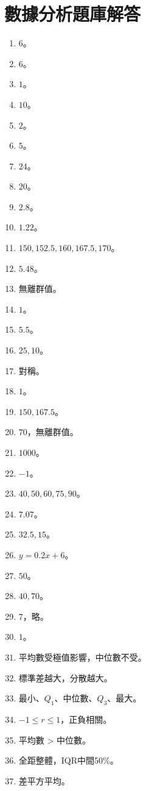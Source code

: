 \section{數據分析題庫解答}
\begin{enumerate}[label=\arabic*.]
    \item $6$。
    \item $6$。
    \item $1$。
    \item $10$。
    \item $2$。
    \item $5$。
    \item $24$。
    \item $20$。
    \item $2.8$。
    \item $1.22$。
    \item $150, 152.5, 160, 167.5, 170$。
    \item $5.48$。
    \item 無離群值。
    \item $1$。
    \item $5.5$。
    \item $25, 10$。
    \item 對稱。
    \item $1$。
    \item $150, 167.5$。
    \item $70$，無離群值。
    \item $1000$。
    \item $-1$。
    \item $40, 50, 60, 75, 90$。
    \item $7.07$。
    \item $32.5, 15$。
    \item $y = 0.2x + 6$。
    \item $50$。
    \item $40, 70$。
    \item $7$，略。
    \item $1$。
    \item 平均數受極值影響，中位數不受。
    \item 標準差越大，分散越大。
    \item 最小、$Q_1$、中位數、$Q_3$、最大。
    \item $-1 \leq r \leq 1$，正負相關。
    \item 平均數 > 中位數。
    \item 全距整體，IQR中間50\%。
    \item 差平方平均。

\end{enumerate}
